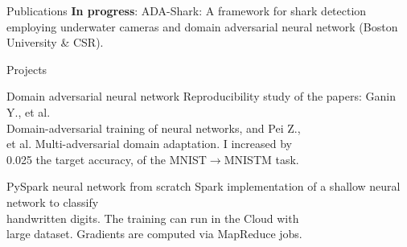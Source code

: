 \documentclass{resume}
\begin{document}
\begin{multicols}{2}
	\begin{rSection}{\Large Publications}
		\textbf{In progress}: ADA-Shark: A framework for shark detection employing underwater cameras and domain adversarial neural network (Boston University \& CSR). 
	\end{rSection}

	\begin{rSection}{\Large Projects}
	
		\begin{project}{Domain adversarial neural network}{}{}{
			Reproducibility study of the papers: Ganin Y., et al. \\Domain-adversarial training of neural networks, and Pei Z.,\\ et al. Multi-adversarial domain adaptation.
			I increased by \\0.025 the target accuracy, of the MNIST$\rightarrow$MNISTM task.
		}
		\end{project}
	
		\begin{project}{PySpark neural network from scratch}{}{}{
		 	Spark implementation of a shallow neural network to classify \\handwritten digits. The training can run in the Cloud with \\large dataset. Gradients are computed via MapReduce jobs.
		}
		\end{project}
		

\end{rSection}
\end{multicols}
\end{document}
